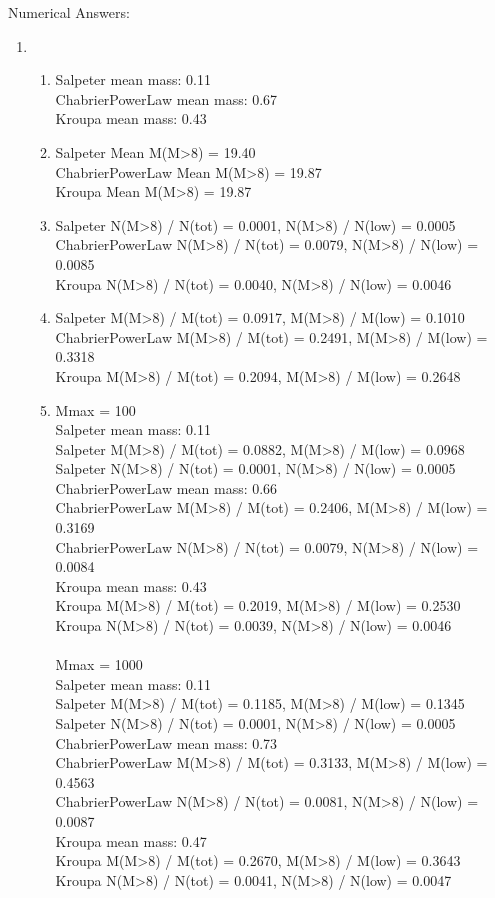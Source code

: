 \documentclass[twoside]{tufte-book} %
\begin{document}
Numerical Answers:
\begin{enumerate}
    \item
\begin{enumerate}
    \item 
        Salpeter mean mass: 0.11 \\
ChabrierPowerLaw mean mass: 0.67 \\
Kroupa mean mass: 0.43
\item Salpeter Mean M(M>8) = 19.40\\
ChabrierPowerLaw Mean M(M>8) = 19.87\\
Kroupa Mean M(M>8) = 19.87
\item Salpeter N(M>8) / N(tot) = 0.0001, N(M>8) / N(low) = 0.0005 \\ 
ChabrierPowerLaw N(M>8) / N(tot) = 0.0079, N(M>8) / N(low) = 0.0085 \\
Kroupa N(M>8) / N(tot) = 0.0040, N(M>8) / N(low) = 0.0046
\item Salpeter M(M>8) / M(tot) = 0.0917, M(M>8) / M(low) = 0.1010 \\
ChabrierPowerLaw M(M>8) / M(tot) = 0.2491, M(M>8) / M(low) = 0.3318 \\
Kroupa M(M>8) / M(tot) = 0.2094, M(M>8) / M(low) = 0.2648
\item Mmax = 100 \\
Salpeter mean mass: 0.11 \\
Salpeter M(M>8) / M(tot) = 0.0882, M(M>8) / M(low) = 0.0968 \\
Salpeter N(M>8) / N(tot) = 0.0001, N(M>8) / N(low) = 0.0005 \\
ChabrierPowerLaw mean mass: 0.66 \\
ChabrierPowerLaw M(M>8) / M(tot) = 0.2406, M(M>8) / M(low) = 0.3169 \\
ChabrierPowerLaw N(M>8) / N(tot) = 0.0079, N(M>8) / N(low) = 0.0084 \\
Kroupa mean mass: 0.43 \\
Kroupa M(M>8) / M(tot) = 0.2019, M(M>8) / M(low) = 0.2530 \\
Kroupa N(M>8) / N(tot) = 0.0039, N(M>8) / N(low) = 0.0046 \\
 \\
Mmax = 1000 \\
Salpeter mean mass: 0.11 \\
Salpeter M(M>8) / M(tot) = 0.1185, M(M>8) / M(low) = 0.1345 \\
Salpeter N(M>8) / N(tot) = 0.0001, N(M>8) / N(low) = 0.0005 \\
ChabrierPowerLaw mean mass: 0.73 \\
ChabrierPowerLaw M(M>8) / M(tot) = 0.3133, M(M>8) / M(low) = 0.4563 \\
ChabrierPowerLaw N(M>8) / N(tot) = 0.0081, N(M>8) / N(low) = 0.0087 \\
Kroupa mean mass: 0.47 \\
Kroupa M(M>8) / M(tot) = 0.2670, M(M>8) / M(low) = 0.3643 \\
Kroupa N(M>8) / N(tot) = 0.0041, N(M>8) / N(low) = 0.0047 


\end{enumerate}
\end{enumerate}
\end{document}
